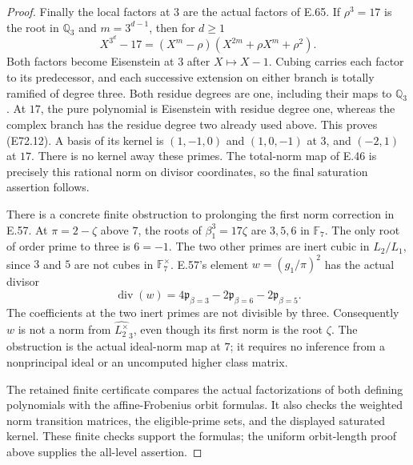 \begin{proof}
Finally the local factors at $3$ are the actual factors
of E.65. If $\rho^3=17$ is the root in $\mathbb Q_3$ and
$m=3^{d-1}$, then for $d\ge1$
\[
 X^{3^d}-17=(X^m-\rho)(X^{2m}+\rho X^m+\rho^2).
 \tag{E72.15}
\]
Both factors become Eisenstein at $3$ after $X\mapsto X-1$.
Cubing carries each factor to its predecessor, and each
successive extension on either branch is totally ramified
of degree three. Both residue degrees are one, including
their maps to $\mathbb Q_3$. At $17$, the pure polynomial
is Eisenstein with residue degree one, whereas the complex
branch has the residue degree two already used above.
This proves (E72.12). A basis of its kernel is
$(1,-1,0)$ and $(1,0,-1)$ at $3$, and $(-2,1)$ at $17$.
There is no kernel away these primes. The total-norm map
of E.46 is precisely this rational norm on divisor
coordinates, so the final saturation assertion follows.

There is a concrete finite obstruction to prolonging the
first norm correction in E.57. At $\pi=2-\zeta$ above $7$,
the roots of $\beta_1^3=17\zeta$ are $3,5,6$ in
$\mathbb F_7$. The only root of order prime to three is
$6=-1$. The two other primes are inert cubic in $L_2/L_1$,
since $3$ and $5$ are not cubes in $\mathbb F_7^\times$.
E.57's element $w=(g_1/\pi)^2$ has the actual divisor
\[
 \operatorname{div}(w)=
 4\mathfrak p_{\beta=3}
       -2\mathfrak p_{\beta=6}
       -2\mathfrak p_{\beta=5}.
 \tag{E72.16}
\]
The coefficients at the two inert primes are not divisible
by three. Consequently $w$ is not a norm from
$\widehat{L_2^\times}_3$, even though its first norm is
the root $\zeta$. The obstruction is the actual ideal-norm
map at $7$; it requires no inference from a nonprincipal
ideal or an uncomputed higher class matrix.

The retained finite certificate compares the actual
factorizations of both defining polynomials with the
affine-Frobenius orbit formulas. It also checks the weighted
norm transition matrices, the eligible-prime sets, and
the displayed saturated kernel. These finite checks support
the formulas; the uniform orbit-length proof above supplies
the all-level assertion.
\end{proof}
